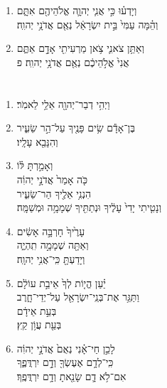 \documentclass[12pt,a4paper,titlepage]{article}
\def \pscolor{red} %
\def \pslabelsep{0.8em} %
\def \psleftmargin{0em} %
\begin{document}
\begin{hebrew}
\begin{enumerate}[leftmargin=\psleftmargin, labelsep=\pslabelsep, label=\fontspec{Linux Libertine}\arabic*, font=\color{\pscolor}\small\textsuperscript, parsep=0em, itemsep=0em, topsep=0em]
      \item \texthebrew{וְיָדְע֗וּ כִּ֣י אֲנִ֧י יְהוָ֛ה אֱלֹהֵיהֶ֖ם אִתָּ֑ם \\ וְהֵ֗מָּה עַמִּי֙ בֵּ֣ית יִשְׂרָאֵ֔ל נְאֻ֖ם אֲדֹנָ֥י יְהוִֽה׃}
      \item \texthebrew{וְאַתֵּ֥ן צֹאנִ֛י צֹ֥אן מַרְעִיתִ֖י אָדָ֣ם אַתֶּ֑ם \\ אֲנִי֙ אֱלֹ֣הֵיכֶ֔ם נְאֻ֖ם אֲדֹנָ֥י יְהוִֽה׃ פ}
\end{enumerate}
\newpage

\subsection*{}
\section*{}
\vspace{-0.6mm}
\begin{enumerate}[leftmargin=\psleftmargin, labelsep=\pslabelsep, label=\fontspec{Linux Libertine}\arabic*, font=\color{\pscolor}\small\textsuperscript, parsep=0em, itemsep=0em, topsep=0em]
      \item \texthebrew{וַיְהִ֥י דְבַר־יְהוָ֖ה אֵלַ֥י לֵאמֹֽר׃}
      \item \texthebrew{בֶּן־אָדָ֕ם שִׂ֥ים פָּנֶ֖יךָ עַל־הַ֣ר שֵׂעִ֑יר \\ וְהִנָּבֵ֖א עָלָֽיו׃}
      \item \texthebrew{וְאָמַ֣רְתָּ לּ֗וֹ\\  כֹּ֤ה אָמַר֙ אֲדֹנָ֣י יְהוִ֔ה \\ הִנְנִ֥י אֵלֶ֖יךָ הַר־שֵׂעִ֑יר \\ וְנָטִ֤יתִי יָדִי֙ עָלֶ֔יךָ וּנְתַתִּ֖יךָ שְׁמָמָ֥ה וּמְשַׁמָּֽה׃}
      \item \texthebrew{עָרֶ֙יךָ֙ חָרְבָּ֣ה אָשִׂ֔ים \\ וְאַתָּ֖ה שְׁמָמָ֣ה תִֽהְיֶ֑ה \\ וְיָדַעְתָּ֖ כִּֽי־אֲנִ֥י יְהוָֽה׃}
      \item \texthebrew{יַ֗עַן הֱי֤וֹת לְךָ֙ אֵיבַ֣ת עוֹלָ֔ם \\ וַתַּגֵּ֥ר אֶת־בְּנֵֽי־יִשְׂרָאֵ֖ל עַל־יְדֵי־חָ֑רֶב \\ בְּעֵ֣ת אֵידָ֔ם \\ בְּעֵ֖ת עֲוֹ֥ן קֵֽץ׃}
      \item \texthebrew{לָכֵ֣ן חַי־אָ֗נִי נְאֻם֙ אֲדֹנָ֣י יְהוִ֔ה \\ כִּֽי־לְדָ֥ם אֶעֶשְׂךָ֖ וְדָ֣ם יִרְדֲּפֶ֑ךָ \\ אִם־לֹ֥א דָ֛ם שָׂנֵ֖אתָ וְדָ֥ם יִרְדֲּפֶֽךָ׃}

\end{enumerate}
\end{hebrew}
\end{document}
